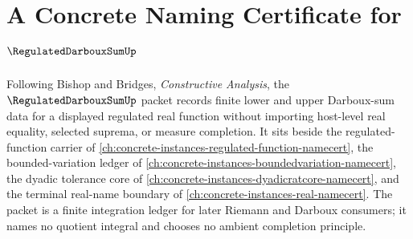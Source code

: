 \chapter{A Concrete Naming Certificate for $\RegulatedDarbouxSumUp$}
\label{ch:concrete-instances-regulated-darboux-sum-namecert}

Following Bishop and Bridges, \emph{Constructive Analysis}, the $\RegulatedDarbouxSumUp$ packet records finite lower and upper Darboux-sum data for a displayed regulated real function without importing host-level real equality, selected suprema, or measure completion. It sits beside the regulated-function carrier of \autoref{ch:concrete-instances-regulated-function-namecert}, the bounded-variation ledger of \autoref{ch:concrete-instances-boundedvariation-namecert}, the dyadic tolerance core of \autoref{ch:concrete-instances-dyadicratcore-namecert}, and the terminal real-name boundary of \autoref{ch:concrete-instances-real-namecert}. The packet is a finite integration ledger for later Riemann and Darboux consumers; it names no quotient integral and chooses no ambient completion principle.

